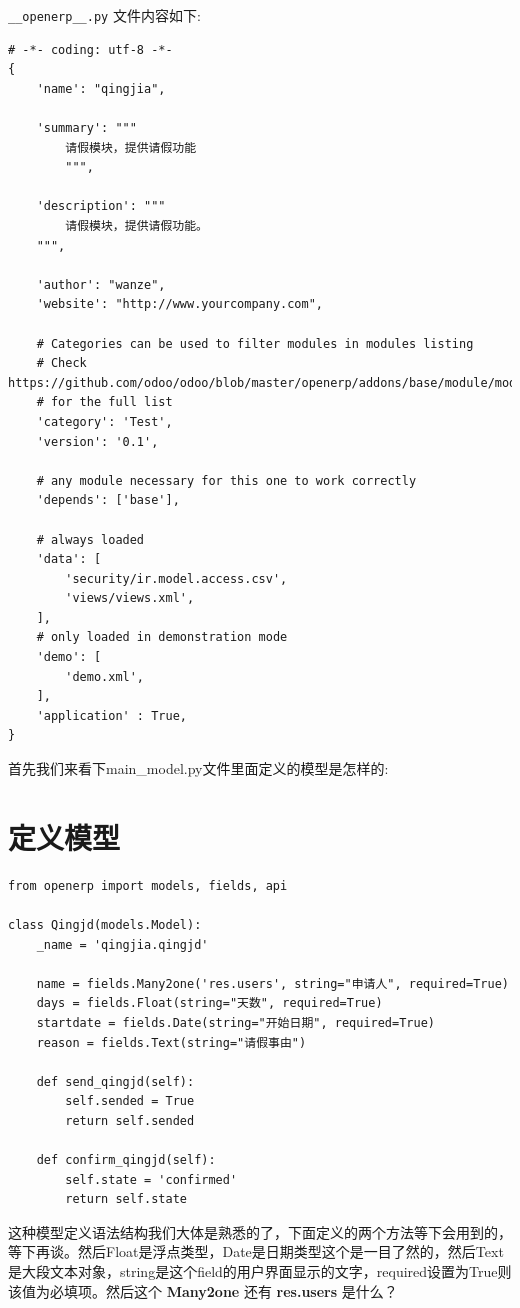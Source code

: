 \documentclass[11pt,a4paper]{sphinxmanual}
\begin{document}
\verb~__openerp__.py~ 文件内容如下:
\begin{Verbatim}
# -*- coding: utf-8 -*-
{
    'name': "qingjia",

    'summary': """
        请假模块，提供请假功能
        """,

    'description': """
        请假模块，提供请假功能。
    """,

    'author': "wanze",
    'website': "http://www.yourcompany.com",

    # Categories can be used to filter modules in modules listing
    # Check https://github.com/odoo/odoo/blob/master/openerp/addons/base/module/module_data.xml
    # for the full list
    'category': 'Test',
    'version': '0.1',

    # any module necessary for this one to work correctly
    'depends': ['base'],

    # always loaded
    'data': [
        'security/ir.model.access.csv',
        'views/views.xml',
    ],
    # only loaded in demonstration mode
    'demo': [
        'demo.xml',
    ],
    'application' : True,
}
\end{Verbatim}

首先我们来看下main\_model.py文件里面定义的模型是怎样的:

\section{定义模型}
\label{sec-6-2}
\begin{verbatim}
from openerp import models, fields, api

class Qingjd(models.Model):
    _name = 'qingjia.qingjd'

    name = fields.Many2one('res.users', string="申请人", required=True)
    days = fields.Float(string="天数", required=True)
    startdate = fields.Date(string="开始日期", required=True)
    reason = fields.Text(string="请假事由")

    def send_qingjd(self):
        self.sended = True
        return self.sended

    def confirm_qingjd(self):
        self.state = 'confirmed'
        return self.state
\end{verbatim}

这种模型定义语法结构我们大体是熟悉的了，下面定义的两个方法等下会用到的，等下再谈。然后Float是浮点类型，Date是日期类型这个是一目了然的，然后Text是大段文本对象，string是这个field的用户界面显示的文字，required设置为True则该值为必填项。然后这个 \textbf{Many2one} 还有 \textbf{res.users} 是什么？
\end{document}
